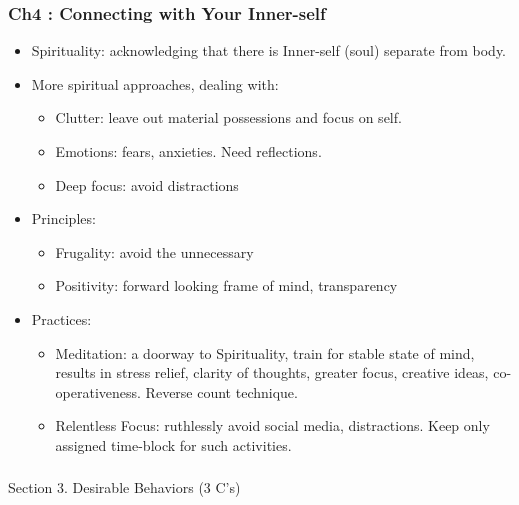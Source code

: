 \begin{frame}[fragile]\frametitle{Ch4 : Connecting with Your Inner-self }

\begin{itemize}
\item Spirituality: acknowledging that there is Inner-self (soul) separate from body.
\item More spiritual approaches, dealing with:
	\begin{itemize}
	\item Clutter: leave out material possessions and focus on self.
	\item Emotions: fears, anxieties. Need reflections.
	\item Deep focus: avoid distractions
	\end{itemize}
\item Principles:
	\begin{itemize}
	\item Frugality: avoid the unnecessary
	\item Positivity: forward looking frame of mind, transparency
	\end{itemize}
\item Practices:
	\begin{itemize}
	\item Meditation: a doorway to Spirituality, train for stable state of mind, results in stress relief, clarity of thoughts, greater focus, creative ideas, co-operativeness. Reverse count technique.
	\item Relentless Focus: ruthlessly avoid social media, distractions. Keep only assigned time-block for such activities.
	\end{itemize}	
\end{itemize}

\end{frame}

\begin{frame}[fragile]\frametitle{}
\begin{center}
{\Large Section 3. Desirable Behaviors (3 C's)}

\end{center}
\end{frame}

